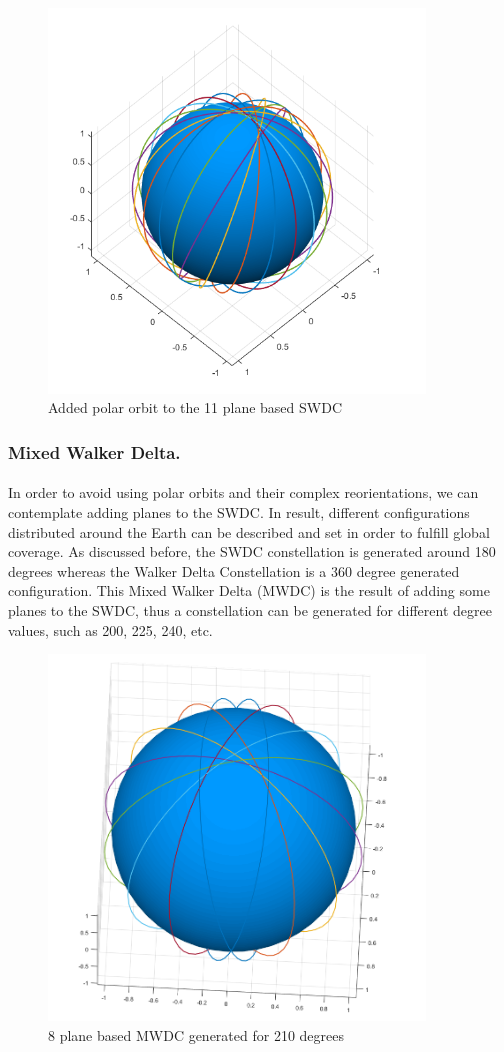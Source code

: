 \begin{figure}[h]
\includegraphics[width=10cm]{semiwalker11p1}
\centering
\caption{Added polar orbit to the 11 plane based SWDC}
\end{figure}

\subsubsection{Mixed Walker Delta.}
\paragraph{ }
In order to avoid using polar orbits and their complex reorientations, we can contemplate adding planes to the SWDC. In result, different configurations distributed around the Earth can be described and set in order to fulfill global coverage. As discussed before, the SWDC constellation is generated around 180 degrees whereas the Walker Delta Constellation is a 360 degree generated configuration. This Mixed Walker Delta (MWDC) is the result of adding some planes to the SWDC, thus a constellation can be generated for different degree values, such as 200, 225, 240, etc. 

\begin{figure}[h]
\includegraphics[width=10cm]{MWDC}
\centering
\caption{8 plane based MWDC generated for 210 degrees}
\end{figure}


